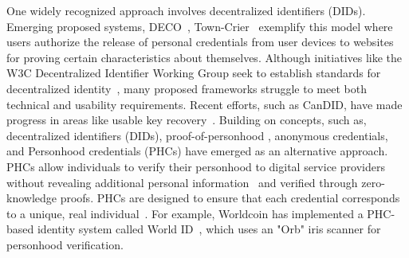 One widely recognized approach involves decentralized identifiers (DIDs). Emerging proposed systems, DECO~\cite{zhang2020deco}, Town-Crier~\cite{zhang2016town}  exemplify this model where users authorize the release of personal credentials from user devices to websites for proving certain characteristics about themselves. Although initiatives like the W3C Decentralized Identifier Working Group seek to establish standards for decentralized identity~\cite{identityDecentralizedIdentity, w3cccgDecentralizedIdentifiers}, many proposed frameworks struggle to meet both technical and usability requirements. Recent efforts, such as CanDID, have made progress in areas like usable key recovery~\cite{maram2021candid}.
Building on concepts, such as, decentralized identifiers (DIDs), proof-of-personhood \cite{ford2020identity}, anonymous credentials, and Personhood credentials (PHCs) have emerged as an alternative approach. PHCs allow individuals to verify their personhood to digital service providers without revealing additional personal information~\cite{adler2024personhood} and verified through zero-knowledge proofs. PHCs are designed to ensure that each credential corresponds to a unique, real individual~\cite{ford2020identity}. For example, Worldcoin has implemented a PHC-based identity system called World ID~\cite{de2024personhood}, which uses an "Orb" iris scanner for personhood verification.







